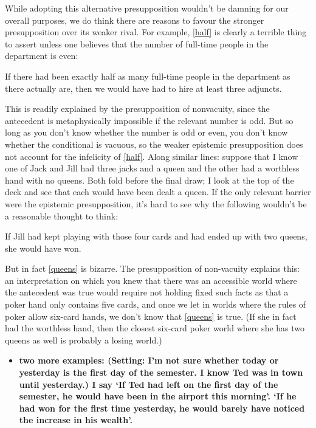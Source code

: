 \documentclass[If.tex]{subfiles}
\begin{document}
\begin{prop}
While adopting this alternative presupposition wouldn't be damning for our overall purposes, we do think there are reasons to favour the stronger presupposition over its weaker rival. For example, \ref{half} is clearly a terrible thing to assert unless one believes that the number of full-time people in the department is even:
\begin{prop}
	\nitem \label{half}
		If there had been exactly half as many full-time people in the department as there actually are, then we would have had to hire at least three adjuncts.
\end{prop}
This is readily explained by the presupposition of nonvacuity, since the antecedent is metaphysically impossible if the relevant number is odd. But so long as you don't know whether the number is odd or even, you don't know whether the conditional is vacuous, so the weaker epistemic presupposition does not account for the infelicity of \ref{half}. Along similar lines: suppose that I know one of Jack and Jill had three jacks and a queen and the other had a worthless hand with no queens. Both fold before the final draw; I look at the top of the deck and see that each would have been dealt a queen. If the only relevant barrier were the epistemic presupposition, it's hard to see why the following wouldn't be a reasonable thought to think:
\begin{prop}
	\nitem \label{queens}
		If Jill had kept playing with those four cards and had ended up with two queens, she would have won.
\end{prop}
But in fact \ref{queens} is bizarre. The presupposition of non-vacuity explains this: an interpretation on which you knew that there was an accessible world where the antecedent was true would require not holding fixed such facts as that a poker hand only contains five cards, and once we let in worlds where the rules of poker allow six-card hands, we don't know that \ref{queens} is true. (If she in fact had the worthless hand, then the closest six-card poker world where she has two queens as well is probably a losing world.)

\begin{itemize} 
	\item
	\textbf{two more examples: (Setting: I'm not sure whether today or yesterday is the first day of the semester. I know Ted was in town until yesterday.) I say ‘If Ted had left on the first day of the semester, he would have been in the airport this morning’. ‘If he had won for the first time yesterday, he would barely have noticed the increase in his wealth’.} 
\end{itemize}


\end{prop}
\end{document}
